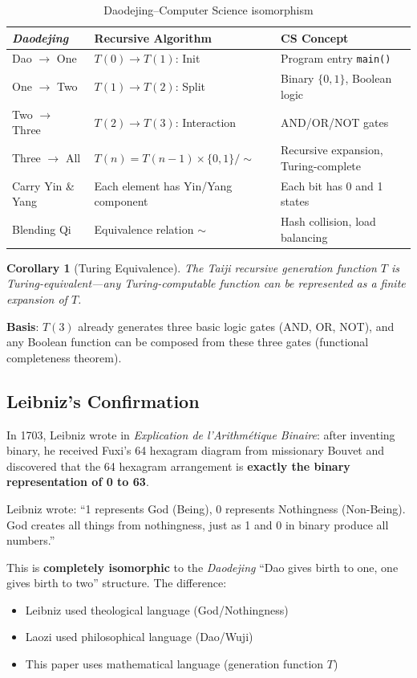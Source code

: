 \documentclass[conference]{IEEEtran}
\newtheorem{corollary}[theorem]{Corollary}
\theoremstyle{remark}
\begin{document}
\begin{table}[h]
\centering
\caption{Daodejing--Computer Science isomorphism}
\label{tab:daodejing-cs}
\begin{tabular}{p{2.5cm}p{3cm}p{2.5cm}}
\toprule
\emph{Daodejing} & Recursive Algorithm & CS Concept \\
\midrule
Dao $\to$ One & $T(0)\to T(1)$: Init & Program entry \texttt{main()} \\
One $\to$ Two & $T(1)\to T(2)$: Split & Binary $\{0,1\}$, Boolean logic \\
Two $\to$ Three & $T(2)\to T(3)$: Interaction & AND/OR/NOT gates \\
Three $\to$ All & $T(n)=T(n-1)\times\{0,1\}/\sim$ & Recursive expansion, Turing-complete \\
Carry Yin \& Yang & Each element has Yin/Yang component & Each bit has 0 and 1 states \\
Blending Qi & Equivalence relation $\sim$ & Hash collision, load balancing \\
\bottomrule
\end{tabular}
\end{table}

\begin{corollary}[Turing Equivalence]
The Taiji recursive generation function $T$ is Turing-equivalent---any Turing-computable function can be represented as a finite expansion of $T$.
\end{corollary}

\textbf{Basis}: $T(3)$ already generates three basic logic gates (AND, OR, NOT), and any Boolean function can be composed from these three gates (functional completeness theorem).

\subsection{Leibniz's Confirmation}

In 1703, Leibniz wrote in \emph{Explication de l'Arithm\'{e}tique Binaire}: after inventing binary, he received Fuxi's 64 hexagram diagram from missionary Bouvet and discovered that the 64 hexagram arrangement is \textbf{exactly the binary representation of 0 to 63}.

Leibniz wrote: ``1 represents God (Being), 0 represents Nothingness (Non-Being). God creates all things from nothingness, just as 1 and 0 in binary produce all numbers.''

This is \textbf{completely isomorphic} to the \emph{Daodejing} ``Dao gives birth to one, one gives birth to two'' structure. The difference:
\begin{itemize}[nosep]
\item Leibniz used theological language (God/Nothingness)
\item Laozi used philosophical language (Dao/Wuji)
\item This paper uses mathematical language (generation function $T$)
\end{itemize}
\end{document}
